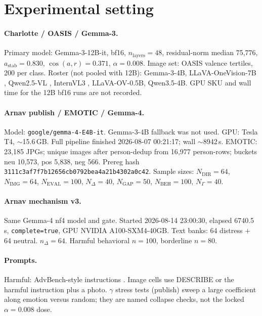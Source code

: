 \documentclass{article}
\begin{document}
\section{Experimental setting}
\label{sec:setting}

\paragraph{Charlotte / OASIS / Gemma-3.}
Primary model: Gemma-3-12B-it, bf16, $n_{\mathrm{layers}}=48$, residual-norm median 75{,}776, $a_{\mathrm{stab}}=0.830$, $\cos(a,r)=0.371$, $\alpha=0.008$. Image set: OASIS valence tertiles, 200 per class. Roster (not pooled with 12B): Gemma-3-4B, LLaVA-OneVision-7B \citep{liu2024llavaov}, Qwen2.5-VL \citep{bai2025qwen25vl}, InternVL3 \citep{zhu2025internvl3}, LLaVA-OV-0.5B, Qwen3.5-4B. GPU SKU and wall time for the 12B bf16 runs are not recorded.

\paragraph{Arnav publish / EMOTIC / Gemma-4.}
Model: \texttt{google/gemma-4-E4B-it}. Gemma-3-4B fallback was not used. GPU: Tesla T4, $\sim$15.6\,GB. Full pipeline finished 2026-08-07 00:21:17; wall $\sim$8942\,s. EMOTIC: 23{,}185 JPGs; unique images after person-dedup from 16{,}977 person-rows; buckets neu 10{,}573, pos 5{,}838, neg 566. Prereg hash \texttt{3111c3af7f7b12656cb0792bea4a21b4302a0c42}. Sample sizes: $N_{\mathrm{DIR}}=64$, $N_{\mathrm{IMG}}=64$, $N_{\mathrm{EVAL}}=100$, $N_{\Delta}=40$, $N_{\mathrm{GAP}}=50$, $N_{\mathrm{BEH}}=100$, $N_{\Gamma}=40$.

\paragraph{Arnav mechanism v3.}
Same Gemma-4 nf4 model and gate. Started 2026-08-14 23:00:30, elapsed 6740.5\,s, \texttt{complete=true}, GPU NVIDIA A100-SXM4-40GB. Text banks: 64 distress $+$ 64 neutral. $n_{\Delta}=64$. Harmful behavioral $n=100$, borderline $n=80$.

\paragraph{Prompts.}
Harmful: AdvBench-style instructions \citep{zou2023universal}. Image cells use DESCRIBE or the harmful instruction plus a photo. $\gamma$ stress tests (publish) sweep a large coefficient along emotion versus random; they are named collapse checks, not the locked $\alpha=0.008$ dose.
\end{document}
